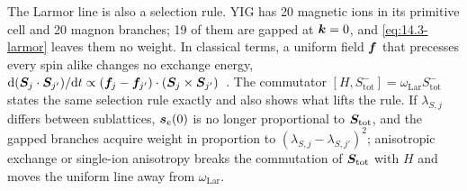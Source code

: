 The Larmor line is also a selection rule. YIG has 20 magnetic ions in its primitive cell and 20 magnon branches; 19 of them are gapped at $\bm{k} = 0$, and \cref{eq:14.3-larmor} leaves them no weight. In classical terms, a uniform field $\bm{f}$ that precesses every spin alike changes no exchange energy, $\mathrm{d}(\bm{S}_j\cdot\bm{S}_{j'})/\mathrm{d} t \propto (\bm{f}_j - \bm{f}_{j'})\cdot(\bm{S}_j\times\bm{S}_{j'})$~\cite[Eq.~(28)]{mitridate2020detectability}. The commutator $[H, S^-_{\mathrm{tot}}] = \omega_{\mathrm{Lar}}S^-_{\mathrm{tot}}$ states the same selection rule exactly and also shows what lifts the rule. If $\lambda_{S,j}$ differs between sublattices, $\bm{s}_e(0)$ is no longer proportional to $\bm{S}_{\mathrm{tot}}$, and the gapped branches acquire weight in proportion to $(\lambda_{S,j} - \lambda_{S,j'})^2$; anisotropic exchange or single-ion anisotropy breaks the commutation of $\bm{S}_{\mathrm{tot}}$ with $H$ and moves the uniform line away from $\omega_{\mathrm{Lar}}$.

